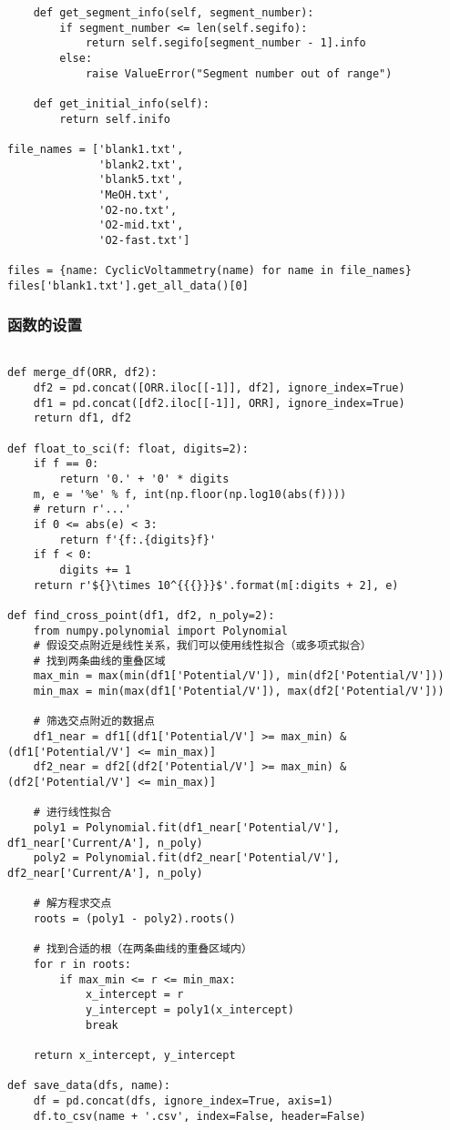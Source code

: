 \begin{verbatim}
    def get_segment_info(self, segment_number):
        if segment_number <= len(self.segifo):
            return self.segifo[segment_number - 1].info
        else:
            raise ValueError("Segment number out of range")
        
    def get_initial_info(self):
        return self.inifo

file_names = ['blank1.txt', 
              'blank2.txt',
              'blank5.txt',
              'MeOH.txt',
              'O2-no.txt',
              'O2-mid.txt',
              'O2-fast.txt']

files = {name: CyclicVoltammetry(name) for name in file_names}
files['blank1.txt'].get_all_data()[0]
\end{verbatim}

\subsubsection{函数的设置}\label{cap:1-2}
\begin{verbatim}

def merge_df(ORR, df2):
    df2 = pd.concat([ORR.iloc[[-1]], df2], ignore_index=True)
    df1 = pd.concat([df2.iloc[[-1]], ORR], ignore_index=True)
    return df1, df2

def float_to_sci(f: float, digits=2):
    if f == 0:
        return '0.' + '0' * digits
    m, e = '%e' % f, int(np.floor(np.log10(abs(f))))
    # return r'...'
    if 0 <= abs(e) < 3:
        return f'{f:.{digits}f}'
    if f < 0:
        digits += 1
    return r'${}\times 10^{{{}}}$'.format(m[:digits + 2], e)

def find_cross_point(df1, df2, n_poly=2):
    from numpy.polynomial import Polynomial
    # 假设交点附近是线性关系，我们可以使用线性拟合（或多项式拟合）
    # 找到两条曲线的重叠区域
    max_min = max(min(df1['Potential/V']), min(df2['Potential/V']))
    min_max = min(max(df1['Potential/V']), max(df2['Potential/V']))

    # 筛选交点附近的数据点
    df1_near = df1[(df1['Potential/V'] >= max_min) & (df1['Potential/V'] <= min_max)]
    df2_near = df2[(df2['Potential/V'] >= max_min) & (df2['Potential/V'] <= min_max)]

    # 进行线性拟合
    poly1 = Polynomial.fit(df1_near['Potential/V'], df1_near['Current/A'], n_poly) 
    poly2 = Polynomial.fit(df2_near['Potential/V'], df2_near['Current/A'], n_poly)

    # 解方程求交点
    roots = (poly1 - poly2).roots()

    # 找到合适的根（在两条曲线的重叠区域内）
    for r in roots:
        if max_min <= r <= min_max:
            x_intercept = r
            y_intercept = poly1(x_intercept)
            break

    return x_intercept, y_intercept

def save_data(dfs, name):
    df = pd.concat(dfs, ignore_index=True, axis=1)
    df.to_csv(name + '.csv', index=False, header=False)

\end{verbatim}

